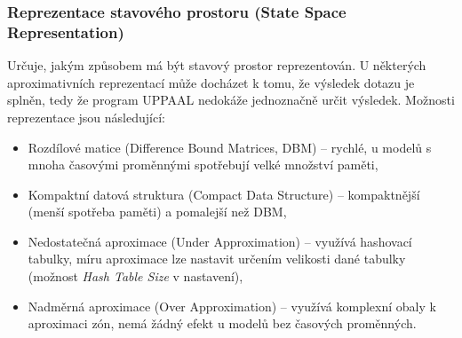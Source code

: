 \subsubsection{Reprezentace stavového prostoru (State Space Representation)}
Určuje, jakým způsobem má být stavový prostor reprezentován. U některých aproximativních reprezentací může docházet k tomu, že výsledek dotazu je  splněn, tedy že program UPPAAL nedokáže jednoznačně určit výsledek. Možnosti reprezentace jsou následující:
\begin{itemize}
    \item Rozdílové matice (Difference Bound Matrices, DBM) -- rychlé, u modelů s mnoha časovými proměnnými spotřebují velké množství paměti,
    \item Kompaktní datová struktura (Compact Data Structure) -- kompaktnější (menší spotřeba paměti) a pomalejší než DBM,
    \item Nedostatečná aproximace (Under Approximation) -- využívá hashovací tabulky, míru aproximace lze nastavit určením velikosti dané tabulky (možnost \textit{Hash Table Size} v nastavení),
    \item Nadměrná aproximace (Over Approximation) -- využívá komplexní obaly k aproximaci zón, nemá žádný efekt u modelů bez časových proměnných.
\end{itemize}

